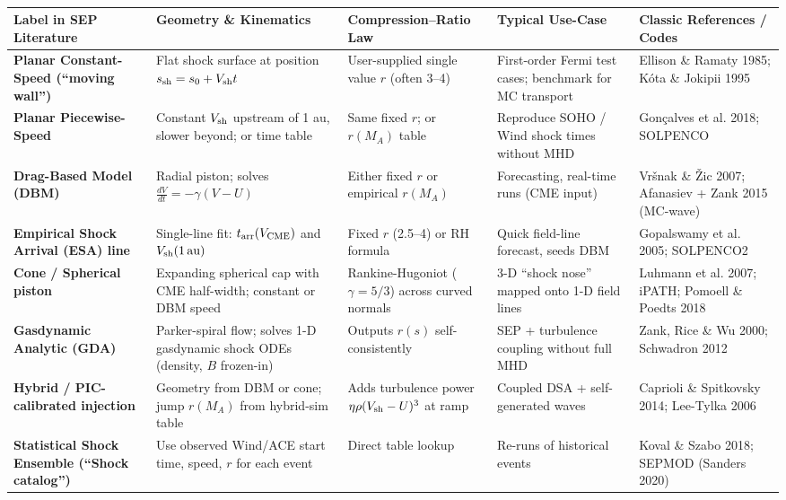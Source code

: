 \begin{table}[h!]
\centering
\begin{tabular}{|p{3.5cm}|p{3.5cm}|p{3.5cm}|p{3.5cm}|p{3.5cm}|}
\hline
\textbf{Label in SEP Literature} & \textbf{Geometry \& Kinematics} & \textbf{Compression–Ratio Law} & \textbf{Typical Use-Case} & \textbf{Classic References / Codes} \\
\hline
\textbf{Planar Constant-Speed (“moving wall”)} & Flat shock surface at position $s_{\rm sh} = s_0 + V_{\rm sh} t$ & User-supplied single value $r$ (often 3–4) & First-order Fermi test cases; benchmark for MC transport & Ellison \& Ramaty 1985; Kóta \& Jokipii 1995 \\
\hline
\textbf{Planar Piecewise-Speed} & Constant $V_{\rm sh}$ upstream of 1 au, slower beyond; or time table & Same fixed $r$; or $r(M_A)$ table & Reproduce SOHO / Wind shock times without MHD & Gonçalves et al. 2018; SOLPENCO \\
\hline
\textbf{Drag-Based Model (DBM)} & Radial piston; solves $\frac{dV}{dt} = -\gamma(V - U)$ & Either fixed $r$ or empirical $r(M_A)$ & Forecasting, real-time runs (CME input) & Vršnak \& Žic 2007; Afanasiev + Zank 2015 (MC-wave) \\
\hline
\textbf{Empirical Shock Arrival (ESA) line} & Single-line fit: $t_{\rm arr}(V_{\rm CME})$ and $V_{\rm sh}(1\,\text{au})$ & Fixed $r$ (2.5–4) or RH formula & Quick field-line forecast, seeds DBM & Gopalswamy et al. 2005; SOLPENCO2 \\
\hline
\textbf{Cone / Spherical piston} & Expanding spherical cap with CME half-width; constant or DBM speed & Rankine-Hugoniot ($\gamma = 5/3$) across curved normals & 3-D “shock nose” mapped onto 1-D field lines & Luhmann et al. 2007; iPATH; Pomoell \& Poedts 2018 \\
\hline
\textbf{Gasdynamic Analytic (GDA)} & Parker-spiral flow; solves 1-D gasdynamic shock ODEs (density, $B$ frozen-in) & Outputs $r(s)$ self-consistently & SEP + turbulence coupling without full MHD & Zank, Rice \& Wu 2000; Schwadron 2012 \\
\hline
\textbf{Hybrid / PIC-calibrated injection} & Geometry from DBM or cone; jump $r(M_A)$ from hybrid-sim table & Adds turbulence power $\eta \rho (V_{\rm sh} - U)^3$ at ramp & Coupled DSA + self-generated waves & Caprioli \& Spitkovsky 2014; Lee-Tylka 2006 \\
\hline
\textbf{Statistical Shock Ensemble (“Shock catalog”)} & Use observed Wind/ACE start time, speed, $r$ for each event & Direct table lookup & Re-runs of historical events & Koval \& Szabo 2018; SEPMOD (Sanders 2020) \\
\hline
\end{tabular}
\caption*{}
\end{table}

